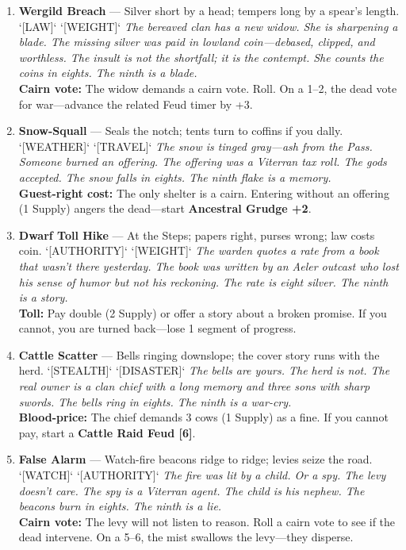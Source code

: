 \begin{enumerate}
\item \textbf{Wergild Breach} --- Silver short by a head; tempers long by a spear's length. `[LAW]` `[WEIGHT]`
  \hfill \textit{The bereaved clan has a new widow. She is sharpening a blade. The missing silver was paid in lowland coin---debased, clipped, and worthless. The insult is not the shortfall; it is the contempt. She counts the coins in eights. The ninth is a blade.} \\
  \textbf{Cairn vote:} The widow demands a cairn vote. Roll. On a 1--2, the dead vote for war---advance the related Feud timer by +3.

\item \textbf{Snow-Squall} --- Seals the notch; tents turn to coffins if you dally. `[WEATHER]` `[TRAVEL]`
  \hfill \textit{The snow is tinged gray---ash from the Pass. Someone burned an offering. The offering was a Viterran tax roll. The gods accepted. The snow falls in eights. The ninth flake is a memory.} \\
  \textbf{Guest-right cost:} The only shelter is a cairn. Entering without an offering (1 Supply) angers the dead---start \textbf{Ancestral Grudge +2}.

\item \textbf{Dwarf Toll Hike} --- At the Steps; papers right, purses wrong; law costs coin. `[AUTHORITY]` `[WEIGHT]`
  \hfill \textit{The warden quotes a rate from a book that wasn't there yesterday. The book was written by an Aeler outcast who lost his sense of humor but not his reckoning. The rate is eight silver. The ninth is a story.} \\
  \textbf{Toll:} Pay double (2 Supply) or offer a story about a broken promise. If you cannot, you are turned back---lose 1 segment of progress.

\item \textbf{Cattle Scatter} --- Bells ringing downslope; the cover story runs with the herd. `[STEALTH]` `[DISASTER]`
  \hfill \textit{The bells are yours. The herd is not. The real owner is a clan chief with a long memory and three sons with sharp swords. The bells ring in eights. The ninth is a war-cry.} \\
  \textbf{Blood-price:} The chief demands 3 cows (1 Supply) as a fine. If you cannot pay, start a \textbf{Cattle Raid Feud [6]}.

\item \textbf{False Alarm} --- Watch-fire beacons ridge to ridge; levies seize the road. `[WATCH]` `[AUTHORITY]`
  \hfill \textit{The fire was lit by a child. Or a spy. The levy doesn't care. The spy is a Viterran agent. The child is his nephew. The beacons burn in eights. The ninth is a lie.} \\
  \textbf{Cairn vote:} The levy will not listen to reason. Roll a cairn vote to see if the dead intervene. On a 5--6, the mist swallows the levy---they disperse.


\end{enumerate}
